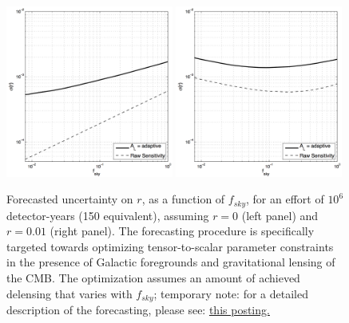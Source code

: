\begin{figure}[ht]
\centering
\includegraphics[width=0.49\textwidth]{Inflation/sigr_fsky_det1e6_r0.png}
\includegraphics[width=0.49\textwidth]{Inflation/sigr_fsky_det1e6_r01.png}
\caption{Forecasted uncertainty on $r$, as a function of $f_{sky}$, for an
effort of $10^6$ detector-years (150 equivalent), assuming $r=0$ (left panel) 
and $r=0.01$ (right panel). The forecasting procedure is specifically targeted 
towards optimizing tensor-to-scalar parameter constraints in the presence of 
Galactic foregrounds and gravitational lensing of the CMB. The optimization 
assumes an amount of achieved delensing that varies with $f_{sky}$; temporary 
note: for a detailed description of the forecasting, please see: 
\href{http://users.physics.harvard.edu/~buza/20150331_fisher/}{this posting.}}
\label{fig_rforecast1}
\end{figure}

